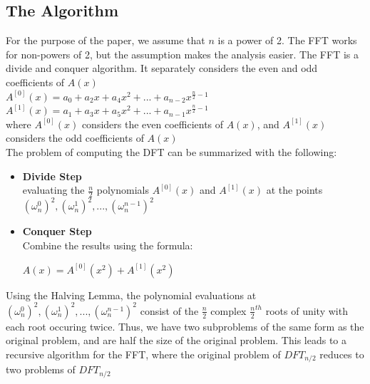 \documentclass{article}
\begin{document}
\subsection{The Algorithm}
For the purpose of the paper, we assume that $n$ is a power of 2. The FFT works for non-powers of 2, but the assumption makes the analysis easier. The FFT is a divide and conquer algorithm. It separately considers the even and odd coefficients of $A(x)$ \\

$A^{[0]}(x)=a_{0}+a_{2}x+a_{4}x^{2}+...+a_{n-2}x^{\frac{n}{2}-1}$ \\
$A^{[1]}(x)=a_{1}+a_{3}x+a_{5}x^{2}+...+a_{n-1}x^{\frac{n}{2}-1}$ \\

where $A^{[0]}(x)$ considers the even coefficients of $A(x)$, and $A^{[1]}(x)$ considers the odd coefficients of $A(x)$ \\
The problem of computing the DFT can be summarized with the following: \\
\begin{itemize}
\item
\textbf{Divide Step} \\
evaluating the $\frac{n}{2}$ polynomials $A^{[0]}(x)$ and $A^{[1]}(x)$ at the points $(\omega_{n}^{0})^{2},(\omega_{n}^{1})^{2},...,(\omega_{n}^{n-1})^{2}$
\item
\textbf{Conquer Step} \\
Combine the results using the formula: \\
\begin{center}
$A(x)=A^{[0]}(x^{2})+A^{[1]}(x^{2})$
\end{center}
\end{itemize}
Using the Halving Lemma, the polynomial evaluations at $(\omega_{n}^{0})^{2},(\omega_{n}^{1})^{2},...,(\omega_{n}^{n-1})^{2}$ consist of the $\frac{n}{2}$ complex $\frac{n}{2}^{th}$ roots of unity with each root occuring twice. Thus, we have two subproblems of the same form as the original problem, and are half the size of the original problem. This leads to a recursive algorithm for the FFT, where the original problem of $DFT_{n/2}$ reduces to two problems of $DFT_{n/2}$
\end{document}
